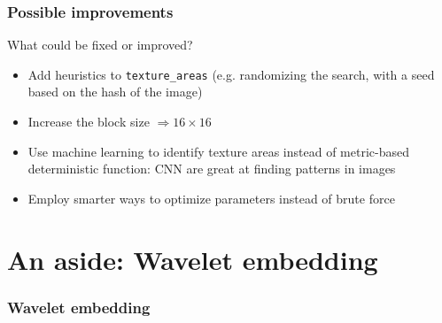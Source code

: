 \begin{frame}
    \frametitle{Possible improvements}

    What could be fixed or improved?

    \begin{itemize}
        \item<2-> Add heuristics to \texttt{texture\_areas} (e.g. randomizing the search, with a seed based on the hash of the image)
        \item<3-> Increase the block size $\Rightarrow 16 \times 16$
        \item<4-> Use machine learning to identify texture areas instead of metric-based deterministic function: CNN are great at finding patterns in images
        \item<5-> Employ smarter ways to optimize parameters instead of brute force
    \end{itemize}
\end{frame}

\section{An aside: Wavelet embedding}

\begin{frame}
    \frametitle{Wavelet embedding}

\end{frame}

